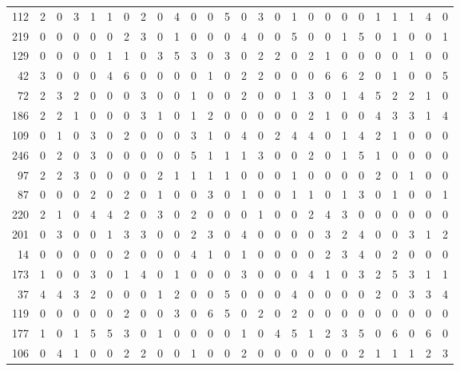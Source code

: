\begin{longtable}{@{\extracolsep{\fill}}rccccccccccccccccccccccccc@{}}
112 & 2 & 0 & 3 & 1 & 1 & 0 & 2 & 0 & 4 & 0 & 0 & 5 & 0 & 3 & 0 & 1 & 0 & 0 & 0 & 0 & 1 & 1 & 1 & 4 & 0 \\
219 & 0 & 0 & 0 & 0 & 0 & 2 & 3 & 0 & 1 & 0 & 0 & 0 & 4 & 0 & 0 & 5 & 0 & 0 & 1 & 5 & 0 & 1 & 0 & 0 & 1 \\
129 & 0 & 0 & 0 & 0 & 1 & 1 & 0 & 3 & 5 & 3 & 0 & 3 & 0 & 2 & 2 & 0 & 2 & 1 & 0 & 0 & 0 & 0 & 1 & 0 & 0 \\
42 & 3 & 0 & 0 & 0 & 4 & 6 & 0 & 0 & 0 & 0 & 1 & 0 & 2 & 2 & 0 & 0 & 0 & 6 & 6 & 2 & 0 & 1 & 0 & 0 & 5 \\
72 & 2 & 3 & 2 & 0 & 0 & 0 & 3 & 0 & 0 & 1 & 0 & 0 & 2 & 0 & 0 & 1 & 3 & 0 & 1 & 4 & 5 & 2 & 2 & 1 & 0 \\
186 & 2 & 2 & 1 & 0 & 0 & 0 & 3 & 1 & 0 & 1 & 2 & 0 & 0 & 0 & 0 & 0 & 2 & 1 & 0 & 0 & 4 & 3 & 3 & 1 & 4 \\
109 & 0 & 1 & 0 & 3 & 0 & 2 & 0 & 0 & 0 & 3 & 1 & 0 & 4 & 0 & 2 & 4 & 4 & 0 & 1 & 4 & 2 & 1 & 0 & 0 & 0 \\
246 & 0 & 2 & 0 & 3 & 0 & 0 & 0 & 0 & 0 & 5 & 1 & 1 & 1 & 3 & 0 & 0 & 2 & 0 & 1 & 5 & 1 & 0 & 0 & 0 & 0 \\
97 & 2 & 2 & 3 & 0 & 0 & 0 & 0 & 2 & 1 & 1 & 1 & 1 & 0 & 0 & 0 & 1 & 0 & 0 & 0 & 0 & 2 & 0 & 1 & 0 & 0 \\
87 & 0 & 0 & 0 & 2 & 0 & 2 & 0 & 1 & 0 & 0 & 3 & 0 & 1 & 0 & 0 & 1 & 1 & 0 & 1 & 3 & 0 & 1 & 0 & 0 & 1 \\
220 & 2 & 1 & 0 & 4 & 4 & 2 & 0 & 3 & 0 & 2 & 0 & 0 & 0 & 1 & 0 & 0 & 2 & 4 & 3 & 0 & 0 & 0 & 0 & 0 & 0 \\
201 & 0 & 3 & 0 & 0 & 1 & 3 & 3 & 0 & 0 & 2 & 3 & 0 & 4 & 0 & 0 & 0 & 0 & 3 & 2 & 4 & 0 & 0 & 3 & 1 & 2 \\
14 & 0 & 0 & 0 & 0 & 0 & 2 & 0 & 0 & 0 & 4 & 1 & 0 & 1 & 0 & 0 & 0 & 0 & 2 & 3 & 4 & 0 & 2 & 0 & 0 & 0 \\
173 & 1 & 0 & 0 & 3 & 0 & 1 & 4 & 0 & 1 & 0 & 0 & 0 & 3 & 0 & 0 & 0 & 4 & 1 & 0 & 3 & 2 & 5 & 3 & 1 & 1 \\
37 & 4 & 4 & 3 & 2 & 0 & 0 & 0 & 1 & 2 & 0 & 0 & 5 & 0 & 0 & 0 & 4 & 0 & 0 & 0 & 0 & 2 & 0 & 3 & 3 & 4 \\
119 & 0 & 0 & 0 & 0 & 0 & 2 & 0 & 0 & 3 & 0 & 6 & 5 & 0 & 2 & 0 & 2 & 0 & 0 & 0 & 0 & 0 & 0 & 0 & 0 & 0 \\
177 & 1 & 0 & 1 & 5 & 5 & 3 & 0 & 1 & 0 & 0 & 0 & 0 & 1 & 0 & 4 & 5 & 1 & 2 & 3 & 5 & 0 & 6 & 0 & 6 & 0 \\
106 & 0 & 4 & 1 & 0 & 0 & 2 & 2 & 0 & 0 & 1 & 0 & 0 & 2 & 0 & 0 & 0 & 0 & 0 & 0 & 2 & 1 & 1 & 1 & 2 & 3 \\

\end{longtable}
